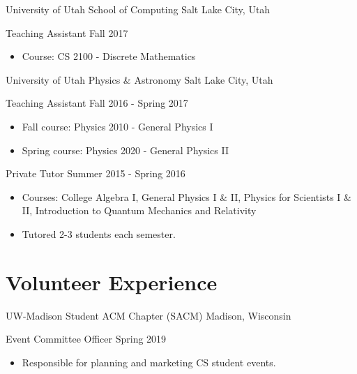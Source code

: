 \blockskip

\begin{tab1} University of Utah School of Computing \> Salt Lake City, Utah \end{tab1}
\begin{tab2} Teaching Assistant \> Fall 2017 \end{tab2}
\begin{itemize}
    \item Course: CS 2100 - Discrete Mathematics
\end{itemize}

\blockskip

\begin{tab1} University of Utah Physics \& Astronomy \> Salt Lake City, Utah \end{tab1}

\begin{tab2} Teaching Assistant \> Fall 2016 - Spring 2017 \end{tab2}
\begin{itemize}
    \item Fall course: Physics 2010 - General Physics I
    \item Spring course: Physics 2020 - General Physics II
\end{itemize}

\begin{tab2} Private Tutor \> Summer 2015 - Spring 2016 \end{tab2}
\begin{itemize}
    \item Courses: College Algebra I, General Physics I \& II, Physics for Scientists I \& II, Introduction to Quantum Mechanics and Relativity
    \item Tutored 2-3 students each semester.
\end{itemize}


\section*{Volunteer Experience}

\begin{tab1} UW-Madison Student ACM Chapter (SACM) \> Madison, Wisconsin \end{tab1}
\begin{tab2} Event Committee Officer \> Spring 2019 \end{tab2}
\begin{itemize}
    \item Responsible for planning and marketing CS student events.
\end{itemize}

